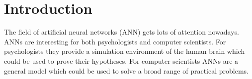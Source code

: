 
\section*{Introduction}
\label{sec:introduction} 


The field of artificial neural networks (ANN) gets lots of attention nowadays. ANNs are interesting for both psychologists and computer scientists. For psychologists they provide a simulation environment of the human brain which could be used to prove their hypotheses. For computer scientists ANNs are a general model which could be used to solve a broad range of practical problems. 





